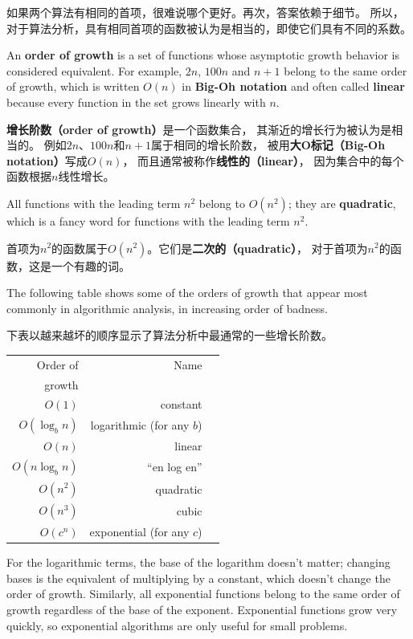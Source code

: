 \documentclass[10pt]{book}
\begin{document}
\begin{CJK}{UTF8}{gbsn}
如果两个算法有相同的首项，很难说哪个更好。再次，答案依赖于细节。
所以，对于算法分析，具有相同首项的函数被认为是相当的，即使它们具有不同的系数。

An {\bf order of growth} is a set of functions whose asymptotic growth
behavior is considered equivalent.  For example, $2n$, $100n$ and $n+1$ 
belong to the same order of growth, which is written $O(n)$ in
{\bf Big-Oh notation} and often called {\bf linear} because every function
in the set grows linearly with $n$.

{\bf 增长阶数（order of growth）}是一个函数集合，
其渐近的增长行为被认为是相当的。
例如$2n$、$100n$和$n+1$属于相同的增长阶数，
被用{\bf 大O标记（Big-Oh notation）}写成$O(n)$，
而且通常被称作{\bf 线性的（linear）}，
因为集合中的每个函数根据$n$线性增长。

All functions with the leading term $n^2$ belong to $O(n^2)$; they are
{\bf quadratic}, which is a fancy word for functions with the
leading term $n^2$.

首项为$n^2$的函数属于$O(n^2)$。它们是{\bf 二次的（quadratic）}，
对于首项为$n^2$的函数，这是一个有趣的词。

The following table shows some of the orders of growth that
appear most commonly in algorithmic analysis,
in increasing order of badness.

下表以越来越坏的顺序显示了算法分析中最通常的一些增长阶数。

\begin{tabular}{|r|r|r|}
\hline
Order of     &   Name      \\
growth       &               \\
\hline
$O(1)$             & constant \\
$O(\log_b n)$      & logarithmic (for any $b$) \\
$O(n)$             & linear \\
$O(n \log_b n)$    & ``en log en'' \\
$O(n^2)$           & quadratic     \\
$O(n^3)$           & cubic     \\
$O(c^n)$           & exponential (for any $c$)    \\
\hline
\end{tabular}

For the logarithmic terms, the base of the logarithm doesn't matter;
changing bases is the equivalent of multiplying by a constant, which
doesn't change the order of growth.  Similarly, all exponential
functions belong to the same order of growth regardless of the base of
the exponent.
Exponential functions grow very quickly, so exponential algorithms are
only useful for small problems.


\end{CJK}
\end{document}

